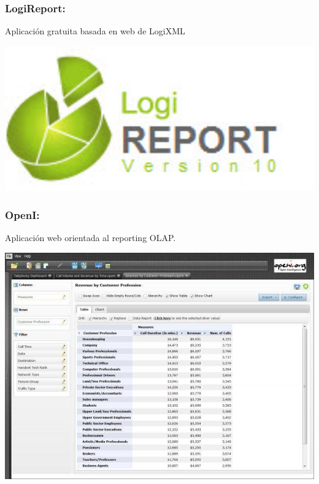 \subsubsection{LogiReport: }\label{sec:nada2}  
Aplicación gratuita basada en web de LogiXML
	\begin{center}
	\includegraphics[width=15cm]{./Imagenes/BIimagen12}
	\end{center}
	
\subsubsection{OpenI: }\label{sec:nada2} 
Aplicación web orientada al reporting OLAP.
	\begin{center}
	\includegraphics[width=15cm]{./Imagenes/BIimagen13}
	\end{center}
	
